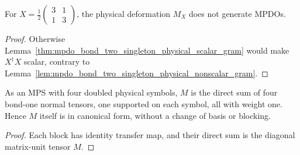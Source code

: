\begin{lemma}%
    \label{thm:mpdo_bond_two_singleton_physical_not_mpdo}
    \leanok
    For $X=\frac12\begin{pmatrix}3&1\\1&3\end{pmatrix}$, the physical
    deformation $M_X$ does not generate MPDOs.
\end{lemma}
\begin{proof}\leanok
    Otherwise Lemma~\ref{thm:mpdo_bond_two_singleton_physical_scalar_gram}
    would make $X^\dagger X$ scalar, contrary to
    Lemma~\ref{lem:mpdo_bond_two_singleton_physical_nonscalar_gram}.
\end{proof}

\begin{lemma}%
    \label{thm:mpdo_bond_two_singleton_cpsv_form}
    \leanok
    As an MPS with four doubled physical symbols, $M$ is the direct sum of
    four bond-one normal tensors, one supported on each symbol, all with weight one.
    Hence $M$ itself is in canonical form, without a change of basis or blocking.
\end{lemma}
\begin{proof}\leanok
    Each block has identity transfer map, and their direct sum is the diagonal
    matrix-unit tensor $M$.
\end{proof}

